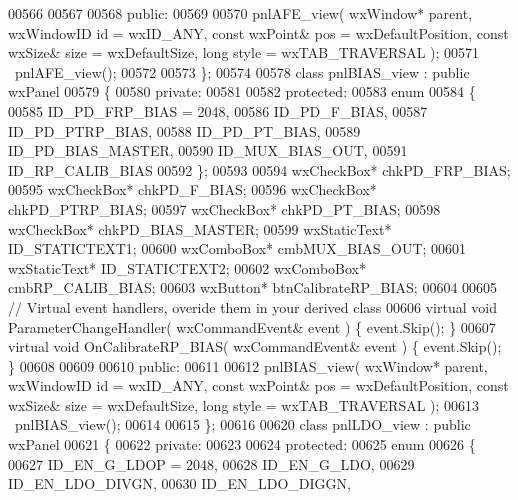 \begin{DoxyCode}
00566         
00567     
00568     \textcolor{keyword}{public}:
00569         
00570         pnlAFE_view( wxWindow* parent, wxWindowID \textcolor{keywordtype}{id} = wxID\_ANY, \textcolor{keyword}{const} wxPoint& pos = wxDefaultPosition, \textcolor{keyword}{
      const} wxSize& size = wxDefaultSize, \textcolor{keywordtype}{long} style = wxTAB\_TRAVERSAL ); 
00571         ~pnlAFE_view();
00572     
00573 \};
00574 
00578 \textcolor{keyword}{class }pnlBIAS_view : \textcolor{keyword}{public} wxPanel 
00579 \{
00580     \textcolor{keyword}{private}:
00581     
00582     \textcolor{keyword}{protected}:
00583         \textcolor{keyword}{enum}
00584         \{
00585             ID\_PD\_FRP\_BIAS = 2048,
00586             ID_PD_F_BIAS,
00587             ID_PD_PTRP_BIAS,
00588             ID_PD_PT_BIAS,
00589             ID_PD_BIAS_MASTER,
00590             ID_MUX_BIAS_OUT,
00591             ID\_RP\_CALIB\_BIAS
00592         \};
00593         
00594         wxCheckBox* chkPD_FRP_BIAS;
00595         wxCheckBox* chkPD_F_BIAS;
00596         wxCheckBox* chkPD_PTRP_BIAS;
00597         wxCheckBox* chkPD_PT_BIAS;
00598         wxCheckBox* chkPD_BIAS_MASTER;
00599         wxStaticText* ID_STATICTEXT1;
00600         wxComboBox* cmbMUX_BIAS_OUT;
00601         wxStaticText* ID_STATICTEXT2;
00602         wxComboBox* cmbRP_CALIB_BIAS;
00603         wxButton* btnCalibrateRP_BIAS;
00604         
00605         \textcolor{comment}{// Virtual event handlers, overide them in your derived class}
00606         \textcolor{keyword}{virtual} \textcolor{keywordtype}{void} ParameterChangeHandler( wxCommandEvent& event ) \{ \textcolor{keyword}{event}.Skip(); \}
00607         \textcolor{keyword}{virtual} \textcolor{keywordtype}{void} OnCalibrateRP_BIAS( wxCommandEvent& event ) \{ \textcolor{keyword}{event}.Skip(); \}
00608         
00609     
00610     \textcolor{keyword}{public}:
00611         
00612         pnlBIAS_view( wxWindow* parent, wxWindowID \textcolor{keywordtype}{id} = wxID\_ANY, \textcolor{keyword}{const} wxPoint& pos = wxDefaultPosition, \textcolor{keyword}{
      const} wxSize& size = wxDefaultSize, \textcolor{keywordtype}{long} style = wxTAB\_TRAVERSAL ); 
00613         ~pnlBIAS_view();
00614     
00615 \};
00616 
00620 \textcolor{keyword}{class }pnlLDO_view : \textcolor{keyword}{public} wxPanel 
00621 \{
00622     \textcolor{keyword}{private}:
00623     
00624     \textcolor{keyword}{protected}:
00625         \textcolor{keyword}{enum}
00626         \{
00627             ID\_EN\_G\_LDOP = 2048,
00628             ID_EN_G_LDO,
00629             ID_EN_LDO_DIVGN,
00630             ID_EN_LDO_DIGGN,

\end{DoxyCode}
